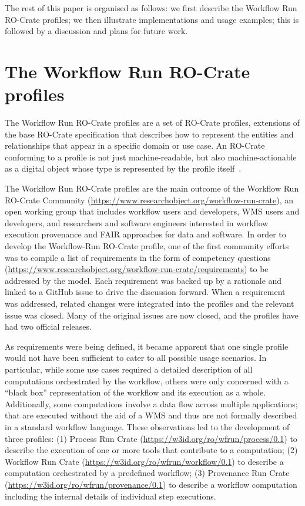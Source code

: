 \documentclass[10pt,letterpaper]{article}
\begin{document}
The rest of this paper is organised as follows: we first describe the Workflow Run RO-Crate profiles; we then illustrate implementations and usage examples; this is followed by a discussion and plans for future work.


\section{The Workflow Run RO-Crate profiles}\label{the-workflow-run-ro-crate-profiles}

The Workflow Run RO-Crate profiles are a set of RO-Crate profiles, 
extensions of the base RO-Crate specification that describes how to represent the entities and relationships that appear in a specific domain or use case.
An RO-Crate conforming to a profile is not just machine-readable, but also machine-actionable as a digital object whose type is represented by the profile itself~\cite{Soiland-Reyes 2022c}.

The Workflow Run RO-Crate profiles are the main outcome of the Workflow Run RO-Crate Community (\url{https://www.researchobject.org/workflow-run-crate}), an open working group that includes workflow users and developers, WMS users and developers, and researchers and software engineers interested in workflow execution provenance and FAIR approaches for data and software.
In order to develop the Workflow-Run RO-Crate profile, one of the first community efforts was to compile a list of requirements in the form of competency questions (\url{https://www.researchobject.org/workflow-run-crate/requirements}) to be addressed by the model.
Each requirement was backed up by a rationale and linked to a GitHub issue to drive the discussion forward. When a requirement was addressed, related changes were integrated into the profiles and the relevant issue was closed. Many of the original issues are now closed, and the profiles have had two official releases.


As requirements were being defined, it became apparent that one single profile would not have been sufficient to cater to all possible usage scenarios.
In particular, while some use cases required a detailed description of all computations orchestrated by the workflow, others were only concerned with a ``black box'' representation of the workflow and its execution as a whole.
Additionally, some computations involve a data flow across multiple applications; that are executed without the aid of a WMS and thus are not formally described in a standard workflow language.
These observations led to the development of three profiles: 
(1) Process Run Crate (\url{https://w3id.org/ro/wfrun/process/0.1})
\cite{Workflow Run RO-Crate working group 2023a} to describe the execution of one or more tools that contribute to a computation;
(2) Workflow Run Crate (\url{https://w3id.org/ro/wfrun/workflow/0.1})
\cite{Workflow Run RO-Crate working group 2023b} to describe a computation orchestrated by a predefined workflow; 
(3) Provenance Run Crate (\url{https://w3id.org/ro/wfrun/provenance/0.1})
\cite{Workflow Run RO-Crate working group 2023c} to describe a workflow computation including the internal details of individual step executions.
\end{document}
